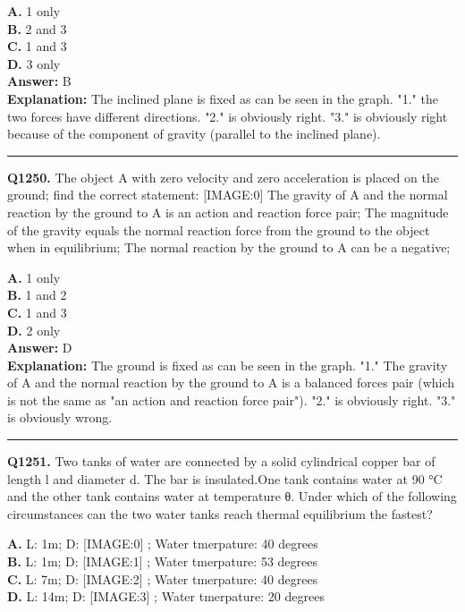 \documentclass[12pt]{article}
\begin{document}
\textbf{A.} 1 only \\
\textbf{B.} 2 and 3 \\
\textbf{C.} 1 and 3 \\
\textbf{D.} 3 only \\

\textbf{Answer:} B \\
\textbf{Explanation:} The inclined plane is fixed as can be seen in the graph. "1." the two forces have different directions. "2." is obviously right. "3." is obviously right because of the component of gravity (parallel to the inclined plane).

\hrule
\vspace{1em}


\noindent
\textbf{Q1250.} The object A with zero velocity and zero acceleration is placed on the ground; find the correct statement:
[IMAGE:0]
The gravity of A and the normal reaction by the ground to A is an action and reaction force pair;
The magnitude of the gravity equals the normal reaction force from the ground to the object when in equilibrium;
The normal reaction by the ground to A can be a negative;



\textbf{A.} 1 only \\
\textbf{B.} 1 and 2 \\
\textbf{C.} 1 and 3 \\
\textbf{D.} 2 only \\

\textbf{Answer:} D \\
\textbf{Explanation:} The ground is fixed as can be seen in the graph. "1." The gravity of A and the normal reaction by the ground to A is a balanced forces pair (which is not the same as "an action and reaction force pair"). "2." is obviously right. "3." is obviously wrong.

\hrule
\vspace{1em}


\noindent
\textbf{Q1251.} Two tanks of water are connected by a solid cylindrical copper bar of length l and diameter d. The bar is insulated.One tank contains water at 90 °C and the other tank
contains water at temperature θ.
Under which of the following circumstances can the two water tanks reach thermal equilibrium the fastest?



\textbf{A.} L: 1m; D:
[IMAGE:0]
;
Water tmerpature: 40 degrees \\
\textbf{B.} L: 1m; D:
[IMAGE:1]
;
Water tmerpature: 53 degrees \\
\textbf{C.} L: 7m; D:
[IMAGE:2]
;
Water tmerpature: 40 degrees \\
\textbf{D.} L: 14m; D:
[IMAGE:3]
;
Water tmerpature: 20 degrees \\
\end{document}
